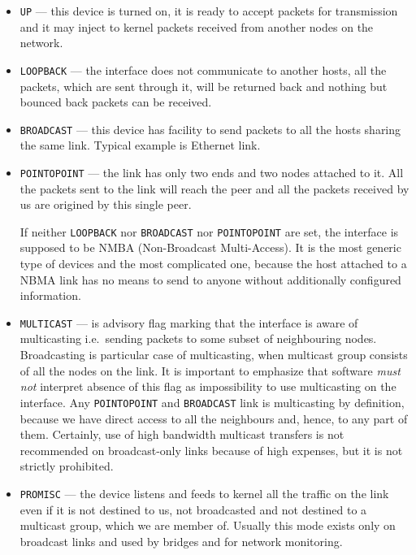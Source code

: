 \begin{itemize}
\item \verb|UP| --- this device is turned on, it is ready to accept
packets for transmission and it may inject to kernel packets received
from another nodes on the network.

\item \verb|LOOPBACK| --- the interface does not communicate to another
hosts, all the packets, which are sent through it, will be returned
back and nothing but bounced back packets can be received.

\item \verb|BROADCAST| --- this device has facility to send packets
to all the hosts sharing the same link. Typical example is Ethernet link.

\item \verb|POINTOPOINT| --- the link has only two ends and two nodes
attached to it. All the packets sent to the link will reach the peer
and all the packets received by us are origined by this single peer.

If neither \verb|LOOPBACK| nor \verb|BROADCAST| nor \verb|POINTOPOINT|
are set, the interface is supposed to be NMBA (Non-Broadcast Multi-Access).
It is the most generic type of devices and the most complicated one, because
the host attached to a NBMA link has no means to send to anyone
without additionally configured information.

\item \verb|MULTICAST| --- is advisory flag marking that the interface
is aware of multicasting i.e.\ sending packets to some subset of neighbouring
nodes. Broadcasting is particular case of multicasting, when multicast
group consists of all the nodes on the link. It is important to emphasize
that software {\em must not\/} interpret absence of this flag as impossibility
to use multicasting on the interface. Any \verb|POINTOPOINT| and
\verb|BROADCAST| link is multicasting by definition, because we have
direct access to all the neighbours and, hence, to any part of them.
Certainly, use of high bandwidth multicast transfers is not recommended
on broadcast-only links because of high expenses, but it is not strictly
prohibited.

\item \verb|PROMISC| --- the device listens and feeds to kernel all the
traffic on the link even if it is not destined to us, not broadcasted
and not destined to a multicast group, which we are member of. Usually
this mode exists only on broadcast links and used by bridges and for network
monitoring.


\end{itemize}
